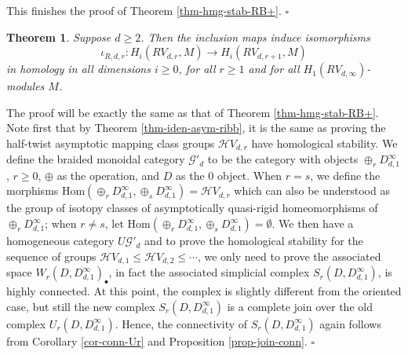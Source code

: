 \documentclass[11pt, a4paper]{amsart}
\newtheorem{thm}{Theorem}[section]
\theoremstyle{definition}
\newcommand{\CG}{{\mathcal {G}}} \newcommand{\CH}{{\mathcal {H}}}
\newcommand{\Hom}{{\mathrm{Hom}}} \renewcommand{\Im}{{\mathrm{Im}}}
\def\sProof{\noindent{\bf Sketch of Proof. }\quad}
\def\qed{\hfill$\square$\smallskip}
\begin{document}
This finishes the proof of Theorem \ref{thm-hmg-stab-RB+}.
\qed


\begin{thm}\label{thm-hmg-stab-RB}
Suppose $d\geq 2$. Then the inclusion maps induce isomorphisms
$$ \iota_{R,d,r}: H_i(RV_{d,r},M) \to H_i(RV_{d,r+1},M)$$
in homology in all dimensions $i \geq 0$, for all $r \geq  1$ and for all $H_1(RV_{d,\infty})$-modules $M$.
\end{thm}
\sProof The proof will be exactly the same as that of Theorem \ref{thm-hmg-stab-RB+}.  Note first that by Theorem \ref{thm-iden-asym-ribb}, it is the same as proving the half-twist asymptotic mapping class groups $ \CH V_{d,r}$  have homological stability.  We define the braided monoidal category $\CG'_d$ to be the category with objects $\oplus_r D^{\infty}_{d,1}$, $r\ge 0$, $\oplus$ as the operation, and $D$ as the $0$ object. When $r=s$, we define the morphisms $\Hom (\oplus_r D^{\infty}_{d,1}, \oplus_s D^{\infty}_{d,1}) = \CH V_{d,r}$  which can also be understood as the group of isotopy classes of  asymptotically quasi-rigid homeomorphisms of $\oplus_r D^{\infty}_{d,1}$; when $r\neq s$, let $\Hom (\oplus_r D^{\infty}_{d,1}, \oplus_s D^{\infty}_{d,1}) =\emptyset $. We then have a homogeneous category $U\CG'_d$ and to prove the homological stability for the sequence of  groups $\CH V_{d,1}\leq \CH V_{d,2}\leq \cdots$, we only need to prove the associated space $W_r(D,D^{\infty}_{d,1})_\bullet$, in fact the associated simplicial complex $S_r(D,D^{\infty}_{d,1})$, is highly connected. At this point, the complex is slightly different from the oriented case, but still the new complex $S_r(D,D^{\infty}_{d,1})$ is a complete join over the old complex $U_r(D,D^{\infty}_{d,1})$. Hence, the connectivity of $S_r(D,D^{\infty}_{d,1})$ again follows from Corollary \ref{cor-conn-Ur} and Proposition \ref{prop-join-conn}.
\qed
















\end{document}
